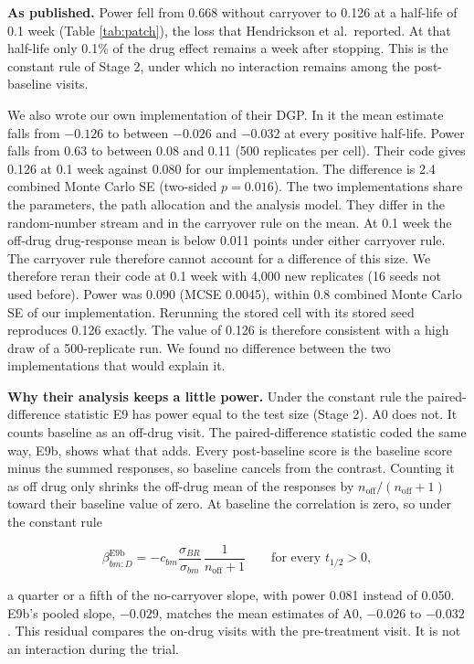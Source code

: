 \documentclass[
  11pt,
]{article}
\begin{document}
\textbf{As published.} Power fell from 0.668 without carryover to 0.126 at
a half-life of 0.1 week (Table \ref{tab:patch}), the loss that
Hendrickson et al.~reported. At that half-life only 0.1\% of the drug
effect remains a week after stopping. This is the constant rule of
Stage 2, under which no interaction remains among the post-baseline
visits.

We also wrote our own implementation of their DGP. In it the mean
estimate falls from \(-0.126\) to between \(-0.026\) and \(-0.032\) at every
positive half-life. Power falls from 0.63 to between 0.08 and 0.11
(500 replicates per cell). Their code gives 0.126 at 0.1 week against
0.080 for our implementation. The difference is 2.4 combined Monte
Carlo SE (two-sided \(p = 0.016\)). The two implementations share the
parameters, the path allocation and the analysis model. They differ
in the random-number stream and in the carryover rule on the mean. At
0.1 week the off-drug drug-response mean is below 0.011 points under
either carryover rule. The carryover rule therefore cannot account for
a difference of this size. We therefore reran their code at 0.1 week
with 4,000 new replicates (16 seeds not used before). Power was
0.090 (MCSE 0.0045), within
0.8
combined Monte Carlo SE of our implementation. Rerunning the stored
cell with its stored seed reproduces 0.126 exactly. The value of 0.126
is therefore consistent with a high draw of a 500-replicate run. We
found no difference between the two implementations that would
explain it.

\textbf{Why their analysis keeps a little power.} Under the constant rule
the paired-difference statistic E9 has power equal to the test size
(Stage 2). A0 does not. It counts
baseline as an off-drug visit. The paired-difference statistic coded
the same way, E9b, shows what that adds. Every post-baseline score is
the baseline score minus the summed responses, so baseline cancels
from the contrast. Counting it as off drug only shrinks the off-drug
mean of the responses by \(n_{\text{off}}/(n_{\text{off}} + 1)\) toward
their baseline value of zero. At baseline the correlation is zero, so
under the constant rule

\[\beta_{bm:D}^{\text{E9b}} = -c_{bm}\frac{\sigma_{BR}}{\sigma_{bm}}\,
  \frac{1}{n_{\text{off}} + 1}
\qquad \text{for every } t_{1/2} > 0 ,\]

a quarter or a fifth of the no-carryover slope, with power 0.081
instead of 0.050. E9b's pooled slope, \(-0.029\), matches the mean
estimates of A0, \(-0.026\) to \(-0.032\).
This residual compares the on-drug visits with the pre-treatment
visit. It is not an interaction during the trial.
\end{document}
